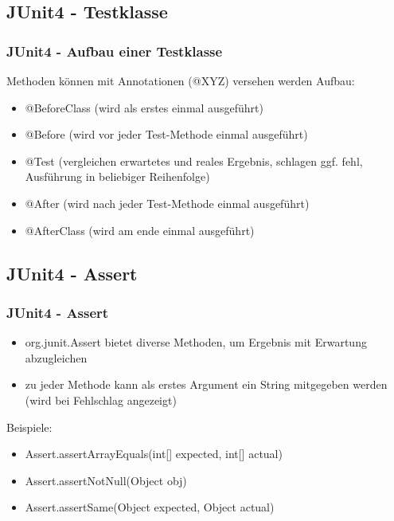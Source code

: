 \documentclass[18pt]{beamer}
\begin{document}
	\subsection{JUnit4 - Testklasse}
	\begin{frame}
		\frametitle{JUnit4 - Aufbau einer Testklasse}
		Methoden können mit Annotationen (@XYZ) versehen werden \linebreak
		Aufbau:
		\begin{itemize}
			\item @BeforeClass (wird als erstes einmal ausgeführt)
			\pause
			\item @Before (wird vor jeder Test-Methode einmal ausgeführt)
			\pause
			\item @Test (vergleichen erwartetes und reales Ergebnis, schlagen ggf. fehl, Ausführung in beliebiger Reihenfolge)
			\pause
			\item @After (wird nach jeder Test-Methode einmal ausgeführt)
			\pause
			\item @AfterClass (wird am ende einmal ausgeführt)
		\end{itemize}
	\end{frame}
	
	\subsection{JUnit4 - Assert}
	\begin{frame}
		\frametitle{JUnit4 - Assert}
		\begin{itemize}
			\item org.junit.Assert bietet diverse Methoden, um Ergebnis mit Erwartung abzugleichen 
			\item zu jeder Methode kann als erstes Argument ein String mitgegeben werden (wird bei Fehlschlag angezeigt) \linebreak
		\end{itemize}
		Beispiele:
		\begin{itemize}
			\item Assert.assertArrayEquals(int[] expected, int[] actual)
			\item Assert.assertNotNull(Object obj)
			\item Assert.assertSame(Object expected, Object actual)
		\end{itemize}
	\end{frame}
	
\end{document}
